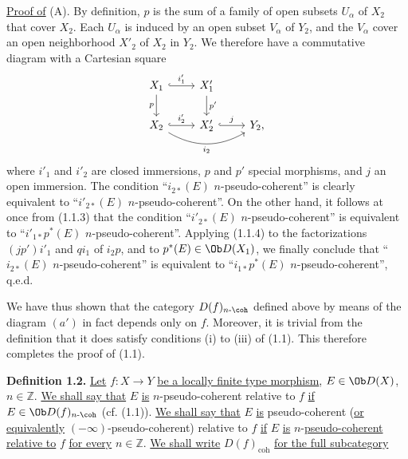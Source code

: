 \uline{Proof of} (A). By definition, \(p\) is the sum of a family of open subsets \(U_\alpha\) of \(X_2\) that cover \(X_2\). Each \(U_\alpha\) is induced by an open subset \(V_\alpha\) of \(Y_2\), and the \(V_\alpha\) cover an open neighborhood \(X'_2\) of \(X_2\) in \(Y_2\). We therefore have a commutative diagram with a Cartesian square
\[
\begin{tikzcd}
X_1 \arrow[r,hook,"i'_1"] \arrow[d,"p"'] & X'_1 \arrow[d,"p'"]\\
X_2 \arrow[r,hook,"i'_2"] \arrow[rr,bend right,"i_2"'] & X'_2 \arrow[r,hook,"j"] & Y_2,
\end{tikzcd}
\]
where \(i'_1\) and \(i'_2\) are closed immersions, \(p\) and \(p'\) special morphisms, and \(j\) an open immersion. The condition ``\(i_{2*}(E)\) \(n\)-pseudo-coherent'' is clearly equivalent to ``\(i'_{2*}(E)\) \(n\)-pseudo-coherent''. On the other hand, it follows at once from (1.1.3) that the condition ``\(i'_{2*}(E)\) \(n\)-pseudo-coherent'' is equivalent to ``\(i'_{1*}p^*(E)\) \(n\)-pseudo-coherent''. Applying (1.1.4) to the factorizations \((jp')i'_1\) and \(qi_1\) of \(i_2p\), and to \(p^*(E)\in\Ob D(X_1)\), we finally conclude that ``\(i_{2*}(E)\) \(n\)-pseudo-coherent'' is equivalent to ``\(i_{1*}p^*(E)\) \(n\)-pseudo-coherent'', q.e.d.

We have thus shown that the category \(D(f)_{n\text{-}\coh}\) defined above by means of the diagram \((a')\) in fact depends only on \(f\). Moreover, it is trivial from the definition that it does satisfy conditions (i) to (iii) of (1.1). This therefore completes the proof of (1.1).

\textbf{Definition 1.2.} \uline{Let} \(f:X\to Y\) \uline{be a locally finite type morphism}, \(E\in\Ob D(X)\), \(n\in\mathbb Z\). \uline{We shall say that} \(E\) \uline{is} \(n\)-pseudo-coherent relative to \(f\) \uline{if} \(E\in\Ob D(f)_{n\text{-}\coh}\) (cf. (1.1)). \uline{We shall say that} \(E\) \uline{is} pseudo-coherent (\uline{or equivalently} \((-\infty)\)-pseudo-coherent) relative to \(f\) \uline{if} \(E\) \uline{is} \(n\)-\uline{pseudo-coherent relative to} \(f\) \uline{for every} \(n\in\mathbb Z\). \uline{We shall write} \(D(f)_{\mathrm{coh}}\) \uline{for the full subcategory}

